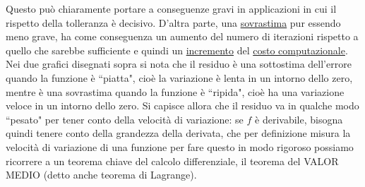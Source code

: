 Questo può chiaramente portare a conseguenze gravi in applicazioni in cui il rispetto della tolleranza è decisivo.
D'altra parte, una \uline{sovrastima} pur essendo meno grave, ha come conseguenza un aumento del numero di iterazioni rispetto a quello che sarebbe sufficiente e quindi un \uline{incremento} del \uline{costo computazionale}.\\
Nei due grafici disegnati sopra si nota che il residuo è una sottostima dell'errore quando la funzione è ``piatta", cioè la variazione è lenta in un intorno dello zero, mentre è una sovrastima quando la funzione è ``ripida", cioè ha una variazione veloce in un intorno dello zero.
Si capisce allora che il residuo va in qualche modo ``pesato" per tener conto della velocità di variazione: se $f$ è derivabile, bisogna quindi tenere conto della grandezza della derivata, che per definizione misura la velocità di variazione di una funzione per fare questo in modo rigoroso possiamo ricorrere a un teorema chiave del calcolo differenziale, il teorema del VALOR MEDIO (detto anche teorema di Lagrange).

